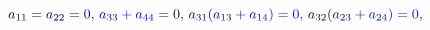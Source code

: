\documentclass[12pt]{article}
\begin{document}
\makeatletter
\renewcommand*{\@textcolor}[3]{%
  \protect\leavevmode
  \begingroup
    \color#1{#2}#3%
  \endgroup
}
\makeatother
\begin{displaymath}
\mathcolor[RGB]{0,0,15}{a} _ { \mathcolor[RGB]{0,0,30}{1} \mathcolor[RGB]{0,0,45}{1} } \mathcolor[RGB]{0,0,60}{=} \mathcolor[RGB]{0,0,75}{a} _ { \mathcolor[RGB]{0,0,90}{2} \mathcolor[RGB]{0,0,105}{2} } \mathcolor[RGB]{0,0,120}{=} \mathcolor[RGB]{0,0,135}{0} \mathcolor[RGB]{0,0,150}{,} \mathcolor[RGB]{0,0,165}{\,
a} _ { \mathcolor[RGB]{0,0,180}{3} \mathcolor[RGB]{0,0,195}{3} } \mathcolor[RGB]{0,0,210}{+} \mathcolor[RGB]{0,0,225}{a} _ { \mathcolor[RGB]{0,0,240}{4} \mathcolor[RGB]{0,0,255}{4} } \mathcolor[RGB]{0,15,0}{=} \mathcolor[RGB]{0,15,15}{0} \mathcolor[RGB]{0,15,30}{,} \mathcolor[RGB]{0,15,45}{\,
a} _ { \mathcolor[RGB]{0,15,60}{3} \mathcolor[RGB]{0,15,75}{1} } \mathcolor[RGB]{0,15,90}{(} \mathcolor[RGB]{0,15,105}{a} _ { \mathcolor[RGB]{0,15,120}{1} \mathcolor[RGB]{0,15,135}{3} } \mathcolor[RGB]{0,15,150}{+} \mathcolor[RGB]{0,15,165}{a} _ { \mathcolor[RGB]{0,15,180}{1} \mathcolor[RGB]{0,15,195}{4} } \mathcolor[RGB]{0,15,210}{)} \mathcolor[RGB]{0,15,225}{=} \mathcolor[RGB]{0,15,240}{0} \mathcolor[RGB]{0,15,255}{,} \mathcolor[RGB]{0,30,0}{\,
a} _ { \mathcolor[RGB]{0,30,15}{3} \mathcolor[RGB]{0,30,30}{2} } \mathcolor[RGB]{0,30,45}{(} \mathcolor[RGB]{0,30,60}{a} _ { \mathcolor[RGB]{0,30,75}{2} \mathcolor[RGB]{0,30,90}{3} } \mathcolor[RGB]{0,30,105}{+} \mathcolor[RGB]{0,30,120}{a} _ { \mathcolor[RGB]{0,30,135}{2} \mathcolor[RGB]{0,30,150}{4} } \mathcolor[RGB]{0,30,165}{)} \mathcolor[RGB]{0,30,180}{=} \mathcolor[RGB]{0,30,195}{0} \mathcolor[RGB]{0,30,210}{,} \,
\end{displaymath}
\end{document}
